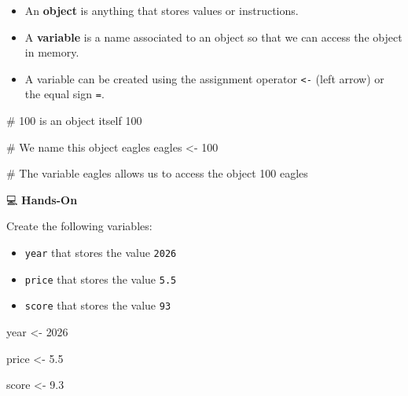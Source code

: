 \documentclass[
  letterpaper,
  DIV=11,
  numbers=noendperiod]{scrreprt}
\newenvironment{Shaded}{\begin{snugshade}}{\end{snugshade}}
\newcommand{\CommentTok}[1]{\textcolor[rgb]{0.37,0.37,0.37}{#1}}
\newcommand{\DecValTok}[1]{\textcolor[rgb]{0.68,0.00,0.00}{#1}}
\newcommand{\FloatTok}[1]{\textcolor[rgb]{0.68,0.00,0.00}{#1}}
\newcommand{\NormalTok}[1]{\textcolor[rgb]{0.00,0.23,0.31}{#1}}
\newcommand{\OtherTok}[1]{\textcolor[rgb]{0.00,0.23,0.31}{#1}}
\begin{document}
\begin{itemize}
\item
  An \textbf{object} is anything that stores values or instructions.
\item
  A \textbf{variable} is a name associated to an object so that we can
  access the object in memory.
\item
  A variable can be created using the assignment operator
  \texttt{\textless{}-} (left arrow) or the equal sign \texttt{=}.
\end{itemize}

\begin{Shaded}
\begin{Highlighting}[]
\CommentTok{\# 100 is an object itself}
\DecValTok{100}

\CommentTok{\# We name this object \textquotesingle{}eagles\textquotesingle{}}
\NormalTok{eagles }\OtherTok{\textless{}{-}} \DecValTok{100}

\CommentTok{\# The variable \textquotesingle{}eagles\textquotesingle{} allows us to access the object 100}
\NormalTok{eagles}
\end{Highlighting}
\end{Shaded}

💻 \textbf{Hands-On}

Create the following variables:

\begin{itemize}
\item
  \texttt{year} that stores the value \texttt{2026}
\item
  \texttt{price} that stores the value \texttt{5.5}
\item
  \texttt{score} that stores the value \texttt{93}
\end{itemize}

\begin{tcolorbox}[enhanced jigsaw, colbacktitle=quarto-callout-tip-color!10!white, opacitybacktitle=0.6, breakable, left=2mm, leftrule=.75mm, toprule=.15mm, toptitle=1mm, bottomtitle=1mm, colframe=quarto-callout-tip-color-frame, opacityback=0, coltitle=black, arc=.35mm, titlerule=0mm, colback=white, bottomrule=.15mm, title=\textcolor{quarto-callout-tip-color}{\faLightbulb}\hspace{0.5em}{Answer}, rightrule=.15mm]

\begin{Shaded}
\begin{Highlighting}[]
\NormalTok{year }\OtherTok{\textless{}{-}} \DecValTok{2026}

\NormalTok{price }\OtherTok{\textless{}{-}} \FloatTok{5.5}

\NormalTok{score }\OtherTok{\textless{}{-}} \FloatTok{9.3}
\end{Highlighting}
\end{Shaded}

\end{tcolorbox}
\end{document}
